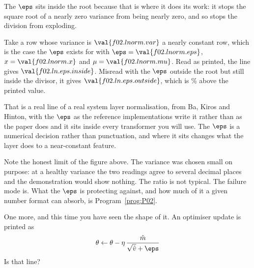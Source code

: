 \begin{fr}
The $\eps$ sits inside the root because that is where it does its work: it
stops the square root of a nearly zero variance from being nearly zero, and so
stops the division from exploding.

Take a row whose variance is $\val{f02.lnorm.var}$ \dash{} a nearly constant
row, which is the case the $\eps$ exists for \dash{} with
$\eps = \val{f02.lnorm.eps}$, $x = \val{f02.lnorm.x}$ and
$\mu = \val{f02.lnorm.mu}$. Read as printed, the line gives
$\val{f02.ln.eps.inside}$. Misread with the $\eps$ outside the root but still
inside the divisor, it gives
$\val{f02.ln.eps.outside}$, which is \% above the
printed value.

\begin{aibox}
That is a real line of a real system \dash{} layer normalisation, from Ba,
Kiros and Hinton, with the $\eps$ as the reference implementations write it
rather than as the paper does \dash{} and it sits inside every transformer you
will use. The
$\eps$ is a numerical decision rather than punctuation, and where it sits
changes what the layer does to a near-constant feature.

Note the honest limit of the figure above. The variance was chosen small on
purpose: at a healthy variance the two readings agree to several decimal places
and the demonstration would show nothing. The ratio is not typical. The failure
mode is. What the $\eps$ is protecting against, and how much of it a given
number format can absorb, is Program~\ref{prog:P02}.
\end{aibox}

One more, and this time you have seen the shape of it. An optimiser update is
printed as
\[ \theta \leftarrow \theta - \eta \, \frac{\hat{m}}{\sqrt{\hat{v}} + \eps} \]
Is  that line?
\nextframe
\end{fr}

